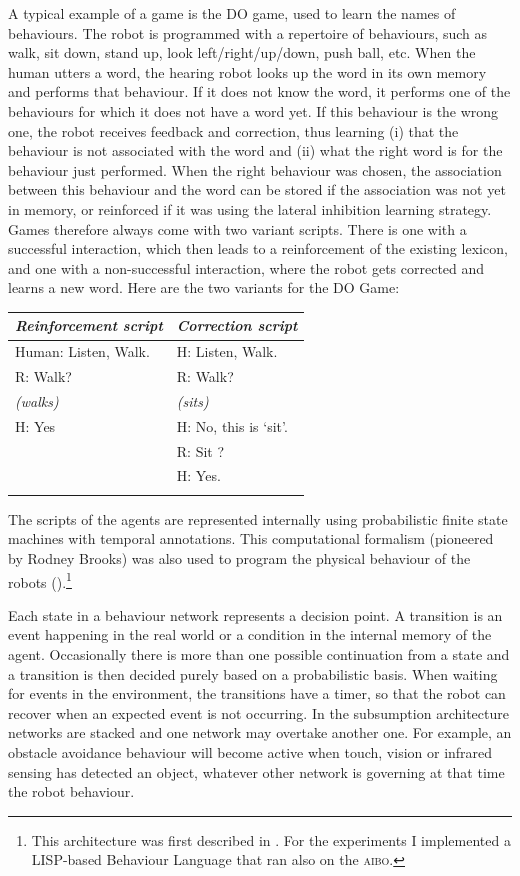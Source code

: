 A typical example of a game is the DO game, used to learn the names of behaviours. 
The robot is programmed with a repertoire of behaviours, such as 
walk, sit down, stand up, look left/right/up/down, push ball, etc. When the human utters a word, the hearing robot 
looks up the word in its own memory and performs that behaviour. If it does not know the word, it 
performs one of the behaviours for which it does not have a word yet. 
If this behaviour is the wrong one, the robot receives feedback and correction, 
thus learning (i) that the behaviour is not associated with the word and (ii) what the right word is for the behaviour 
just performed. When the right behaviour was chosen, the association between this behaviour 
and the word can be stored if the association was not yet in memory, or reinforced if it was using the 
lateral inhibition learning strategy. 
Games therefore always come with two variant scripts. There is one with a successful interaction, which then 
leads to a reinforcement of the existing lexicon, and one with a non-successful interaction, where the 
robot gets corrected and learns a new word. Here are the two variants for the DO Game: 
\begin{center}
\begin{tabular}{ l  l }
\lsptoprule
{\itshape Reinforcement script}&{\itshape Correction script} \\ \midrule
Human: Listen, Walk. & H: Listen, Walk.  \\ 
R: Walk? & R: Walk? \\
 {\itshape (walks)} & {\itshape (sits)} \\
H: Yes & H: No, this is `sit'. \\
& R: Sit ? \\ 
& H: Yes. \\ 
\lspbottomrule
\end{tabular}
\end{center}
The scripts of the agents are represented internally using probabilistic finite state machines with 
temporal annotations. This computational formalism (pioneered by Rodney Brooks) was also used to program the 
physical behaviour of the robots ().\footnote{
This architecture was first described in \cite{Brooks:1986}. 
For the experiments I implemented a LISP-based Behaviour Language that ran also on the \textsc{aibo}.}

Each state in a behaviour network 
represents a decision point. A transition is an event happening in the real world or a condition in 
the internal memory of the agent. Occasionally there is more than one possible continuation from a state 
and a transition is then decided purely based on a probabilistic basis.  
When waiting for events in the environment, the transitions have a timer, so that the robot can recover when an 
expected event is not occurring. In the subsumption architecture networks are stacked and
one network may overtake another one. For example, an obstacle avoidance behaviour will become active when 
touch, vision or infrared sensing has 
detected an object, whatever other network is governing at that time the robot behaviour. 

